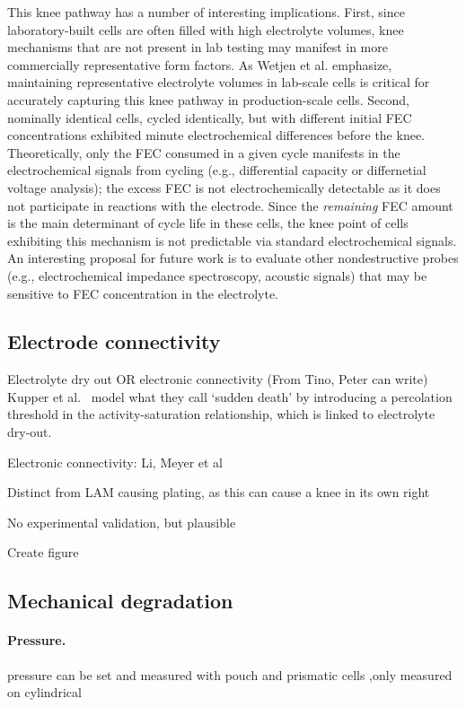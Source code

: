 \documentclass{article}
\begin{document}
This knee pathway has a number of interesting implications.
First, since laboratory-built cells are often filled with high electrolyte volumes, knee mechanisms that are not present in lab testing may manifest in more commercially representative form factors.
As Wetjen et al.\cite{wetjen_differentiating_2017} emphasize,
maintaining representative electrolyte volumes in lab-scale cells is critical for accurately capturing this knee pathway in production-scale cells.
Second, nominally identical cells, cycled identically, but with different initial FEC concentrations exhibited minute electrochemical differences before the knee.\cite{jung_consumption_2016}
Theoretically, only the FEC consumed in a given cycle manifests in the electrochemical signals from cycling (e.g., differential capacity or differnetial voltage analysis); the excess FEC is not electrochemically detectable as it does not participate in reactions with the electrode.
Since the \emph{remaining} FEC amount is the main determinant of cycle life in these cells, the knee point of cells exhibiting this mechanism is not predictable via standard electrochemical signals.
An interesting proposal for future work is to evaluate other nondestructive probes (e.g., electrochemical impedance spectroscopy\cite{zhang_identifying_2020}, acoustic signals\cite{knehr_understanding_2018}) that may be sensitive to FEC concentration in the electrolyte.

\subsection{Electrode connectivity}

Electrolyte dry out OR electronic connectivity
(From Tino, Peter can write) Kupper et al.~\cite{kupper_end--life_2018} model what they call `sudden death' by introducing a percolation threshold in the activity-saturation relationship, which is linked to electrolyte dry-out.

Electronic connectivity: Li, Meyer et al

Distinct from LAM causing plating, as this can cause a knee in its own right

No experimental validation, but plausible

Create figure

\subsection{Mechanical degradation}

\paragraph{Pressure.}
pressure can be set and measured with pouch \cite{wunsch_investigation_2019} and prismatic cells\cite{cannarella_stress_2014} ,only measured on cylindrical \cite{willenberg_high-precision_2020}
\end{document}

